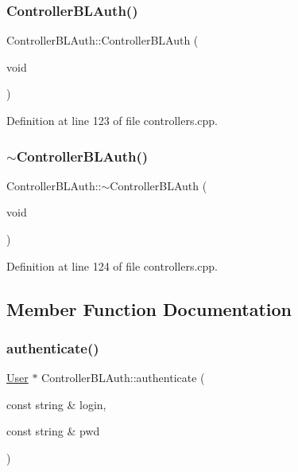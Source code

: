 \subsubsection{\texorpdfstring{Controller\+B\+L\+Auth()}{ControllerBLAuth()}}
{\footnotesize\ttfamily Controller\+B\+L\+Auth\+::\+Controller\+B\+L\+Auth (\begin{DoxyParamCaption}\item[{void}]{ }\end{DoxyParamCaption})}



Definition at line 123 of file controllers.\+cpp.

\mbox{\label{class_controller_b_l_auth_aa24d57c3e2cca656772d5e0f388a2d47}} 
\subsubsection{\texorpdfstring{$\sim$\+Controller\+B\+L\+Auth()}{~ControllerBLAuth()}}
{\footnotesize\ttfamily Controller\+B\+L\+Auth\+::$\sim$\+Controller\+B\+L\+Auth (\begin{DoxyParamCaption}\item[{void}]{ }\end{DoxyParamCaption})}



Definition at line 124 of file controllers.\+cpp.



\subsection{Member Function Documentation}
\mbox{\label{class_controller_b_l_auth_a0571197328b8100922cefc83a9a96987}} 
\subsubsection{\texorpdfstring{authenticate()}{authenticate()}}
{\footnotesize\ttfamily \hyperlink{class_user}{User} $\ast$ Controller\+B\+L\+Auth\+::authenticate (\begin{DoxyParamCaption}\item[{const string \&}]{login,  }\item[{const string \&}]{pwd }\end{DoxyParamCaption})\hspace{0.3cm}{\ttfamily [virtual]}}

